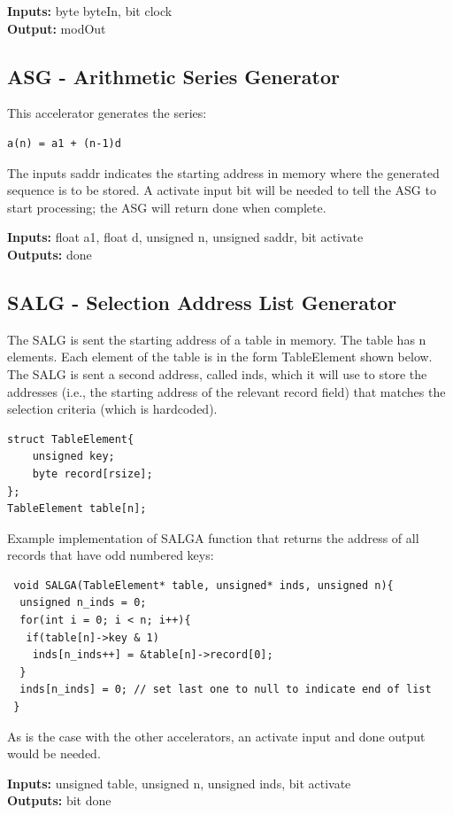 \textbf{Inputs:} byte byteIn, bit clock\\
\textbf{Output:} modOut


\subsection{ASG - Arithmetic Series Generator}
This accelerator generates the series:
\begin{lstlisting}
a(n) = a1 + (n-1)d 
\end{lstlisting}


The inputs saddr indicates the starting address in memory where the generated sequence is to be stored. A activate input bit will be needed to tell the ASG to start processing; the ASG will return done when complete.

\textbf{Inputs:} float a1, float d, unsigned n, unsigned saddr, bit activate\\
\textbf{Outputs:} done


\subsection{SALG - Selection Address List Generator}
The SALG is sent the starting address of a table in memory. The table has n elements. Each element of the table is in the form TableElement shown below. The SALG is sent a second address, called inds, which it will use to store the addresses (i.e., the starting address of the relevant record field) that matches the selection criteria (which is hardcoded).
\begin{lstlisting}
struct TableElement{
    unsigned key;
    byte record[rsize];
};
TableElement table[n];
\end{lstlisting}

Example implementation of SALGA function that returns the address of all records that have odd numbered keys:

\begin{lstlisting}
 void SALGA(TableElement* table, unsigned* inds, unsigned n){
  unsigned n_inds = 0;
  for(int i = 0; i < n; i++){
   if(table[n]->key & 1)
    inds[n_inds++] = &table[n]->record[0];
  }
  inds[n_inds] = 0; // set last one to null to indicate end of list
 }
\end{lstlisting}
As is the case with the other accelerators, an activate input and done output would be needed.

\textbf{Inputs:} unsigned table, unsigned n, unsigned inds, bit activate\\
\textbf{Outputs:} bit done


